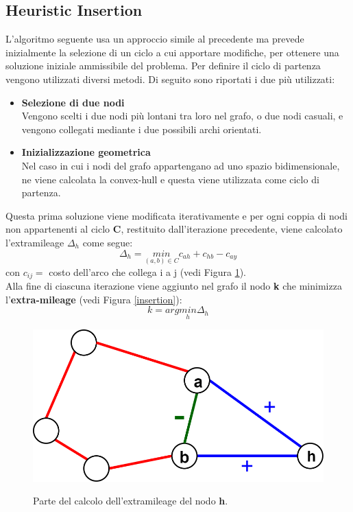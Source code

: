 \subsection{Heuristic Insertion}
L'algoritmo seguente usa un approccio simile al precedente ma prevede inizialmente la selezione di un ciclo a cui apportare modifiche, per ottenere una soluzione iniziale ammissibile del problema. Per definire il ciclo di partenza vengono utilizzati diversi metodi. Di seguito sono riportati i due più utilizzati:
\begin{itemize}
\item{\textbf{Selezione di due nodi}\\
Vengono scelti i due nodi più lontani tra loro nel grafo, o due nodi casuali, e vengono collegati mediante i due possibili archi orientati.
}
\item{\textbf{Inizializzazione geometrica}\\
Nel caso in cui i nodi del grafo appartengano ad uno spazio bidimensionale, ne viene calcolata la convex-hull e questa viene utilizzata come ciclo di partenza.
}
\end{itemize}
Questa prima soluzione viene modificata iterativamente e per ogni coppia di nodi non appartenenti al ciclo \textbf{C}, restituito dall'iterazione precedente, viene calcolato l'extramileage $\Delta_h$ come segue:
$$\Delta_h = \underset{(a,b)\in C}{min} c_{ah}+c_{hb}-c_{ay}$$
con $c_{ij}=$ costo dell'arco che collega i a j (vedi Figura \ref{partial_cycle}).\\
Alla fine di ciascuna iterazione viene aggiunto nel grafo il nodo \textbf{k} che minimizza l'\textbf{extra-mileage} (vedi Figura \ref{insertion}):\\
$$k = arg\underset{h}{min}\Delta_{h}$$
\begin{figure}[H] 
\begin{center} 
  \includegraphics[scale=0.2]{Images/partial_cycle}\\ 
  \caption{\footnotesize{Parte del calcolo dell'extramileage del nodo \textbf{h}.}}
  \label{partial_cycle}
\end{center}
\end{figure}
